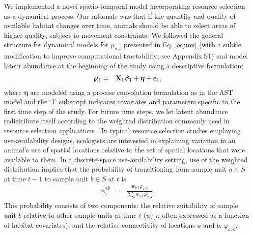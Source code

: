\documentclass[12pt,english]{article}
\begin{document}
\begin{spacing}{1.9}
We implemented a novel spatio-temporal model incorporating resource selection as a dynamical process.  Our rationale was that if the quantity and quality of available habitat changes over time, animals should be able to select areas of higher quality, subject to movement constraints.
We followed the general structure for dynamical models for $\mu_{s,t}$ presented in Eq. \ref{eq:mu} (with a subtle modification to improve computational tractability; see Appendix S1) and model latent abundance at the beginning of the study using a descriptive formulation:
\begin{eqnarray*}
  \boldsymbol{\mu}_{1} & = & {\bf X}_{1} \boldsymbol{\beta}_1 + \boldsymbol{\eta} + \boldsymbol{\epsilon}_1,
\end{eqnarray*}
where $\boldsymbol{\eta}$ are modeled using a process convolution formulation as in the AST model and the `1' subscript indicates covariates and parameters specific to the first time step of the study.  For future time steps, we let latent abundance redistribute itself according to the weighted distribution commonly used in resource selection applications \citep[cf.][]{PatilRao1978,LeleKeim2006,JohnsonEtAl2008}.  In typical resource selection studies employing use-availability designs, ecologists are interested in explaining variation in an animal's use of spatial locations relative to the set of spatial locations that were available to them.  In a discrete-space use-availability setting, use of the weighted distribution implies that the probability of transitioning from sample unit $a \in S$ at time $t-1$ to sample unit $b \in S$ at $t$ is
\begin{eqnarray}
  \psi^{ab}_t & = & \frac{w_{b,t} \varphi_{a,b}}{\sum_s w_{s,t} \varphi_{a,s}}. \label{eq:psi}
\end{eqnarray}
This probability consists of two components: the relative suitability of sample unit $b$ relative to other sample units at time $t$ ($w_{s,t}$; often expressed as a function of habitat covariates), and the relative connectivity of locations $a$ and $b$, $\varphi_{a,b}$.


\end{spacing}
\end{document}
